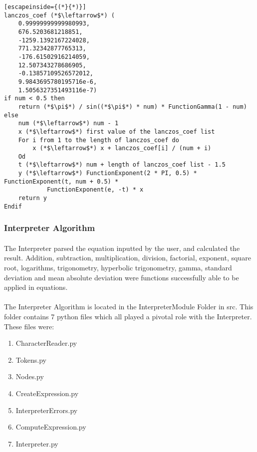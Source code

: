 \begin{itemize}
\begin{lstlisting}[escapeinside={(*}{*)}]
lanczos_coef (*$\leftarrow$*) (
    0.99999999999980993,
    676.5203681218851,
    -1259.1392167224028,
    771.32342877765313,
    -176.61502916214059,
    12.507343278686905,
    -0.13857109526572012,
    9.9843695780195716e-6,
    1.5056327351493116e-7)
if num < 0.5 then
	return (*$\pi$*) / sin((*$\pi$*) * num) * FunctionGamma(1 - num)
else
	num (*$\leftarrow$*) num - 1
	x (*$\leftarrow$*) first value of the lanczos_coef list
	For i from 1 to the length of lanczos_coef do
		x (*$\leftarrow$*) x + lanczos_coef[i] / (num + i)
	Od
	t (*$\leftarrow$*) num + length of lanczos_coef list - 1.5
	y (*$\leftarrow$*) FunctionExponent(2 * PI, 0.5) * FunctionExponent(t, num + 0.5) *
            FunctionExponent(e, -t) * x
    return y
Endif
            \end{lstlisting}

    \end{itemize}

    \subsubsection{Interpreter Algorithm}
        \paragraph{}
        The Interpreter parsed the equation inputted by the user, and calculated the result. Addition, subtraction, multiplication, division, factorial, exponent, square root,  logarithms, trigonometry, hyperbolic trigonometry, gamma, standard deviation and mean absolute deviation were functions successfully able to be applied in equations.

        \paragraph{}
        The Interpreter Algorithm is located in the InterpreterModule Folder in src. This folder contains 7 python files which all played a pivotal role with the Interpreter. These files were:

        \begin{enumerate}
            \item CharacterReader.py
            \item Tokens.py
            \item Nodes.py
            \item CreateExpression.py
            \item InterpreterErrors.py
            \item ComputeExpression.py
            \item Interpreter.py
        \end{enumerate}

